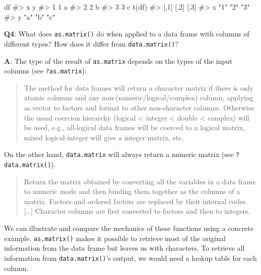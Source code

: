 \documentclass[
]{krantz}
\makeatletter
\newenvironment{Shaded}{\begin{snugshade}}{\end{snugshade}}
\newcommand{\CommentTok}[1]{\textcolor[rgb]{0.56,0.35,0.01}{\textit{#1}}}
\newcommand{\KeywordTok}[1]{\textcolor[rgb]{0.13,0.29,0.53}{\textbf{#1}}}
\newcommand{\NormalTok}[1]{#1}
\newenvironment{kframe}{%
\medskip{}
\setlength{\fboxsep}{.8em}
 \def\at@end@of@kframe{}%
 \ifinner\ifhmode%
  \def\at@end@of@kframe{\end{minipage}}%
  \begin{minipage}{\columnwidth}%
 \fi\fi%
 \def\FrameCommand##1{\hskip\@totalleftmargin \hskip-\fboxsep
 \colorbox{shadecolor}{##1}\hskip-\fboxsep
     \hskip-\linewidth \hskip-\@totalleftmargin \hskip\columnwidth}%
 \MakeFramed {\advance\hsize-\width
   \@totalleftmargin\z@ \linewidth\hsize
   \@setminipage}}%
 {\par\unskip\endMakeFramed%
 \at@end@of@kframe}
\renewenvironment{Shaded}{\begin{kframe}}{\end{kframe}}
\renewcommand{\KeywordTok} [1]{\textcolor[rgb]{0.00,0.44,0.13}{{#1}}}
\renewcommand{\CommentTok} [1]{\textcolor[rgb]{0.38,0.63,0.69}{{#1}}}
\renewcommand{\NormalTok}  [1]{{#1}}
\makeatother
\begin{document}
\begin{Shaded}
\begin{Highlighting}[]
\NormalTok{df}
\CommentTok{#>   x y}
\CommentTok{#> 1 1 a}
\CommentTok{#> 2 2 b}
\CommentTok{#> 3 3 c}
\KeywordTok{t}\NormalTok{(df)}
\CommentTok{#>   [,1] [,2] [,3]}
\CommentTok{#> x "1"  "2"  "3" }
\CommentTok{#> y "a"  "b"  "c"}
\end{Highlighting}
\end{Shaded}

\textbf{{Q4}}: What does \texttt{as.matrix()} do when applied to a data frame with columns of different types? How does it differ from \texttt{data.matrix()}?

\textbf{{A}}: The type of the result of \texttt{as.matrix} depends on the types of the input columns (see \texttt{?as.matrix}):

\begin{quote}
The method for data frames will return a character matrix if there is only atomic columns and any non-(numeric/logical/complex) column, applying as.vector to factors and format to other non-character columns. Otherwise the usual coercion hierarchy (logical \textless{} integer \textless{} double \textless{} complex) will be used, e.g., all-logical data frames will be coerced to a logical matrix, mixed logical-integer will give a integer matrix, etc.
\end{quote}

On the other hand, \texttt{data.matrix} will always return a numeric matrix (see \texttt{?data.matrix()}).

\begin{quote}
Return the matrix obtained by converting all the variables in a data frame to numeric mode and then binding them together as the columns of a matrix. Factors and ordered factors are replaced by their internal codes. {[}\ldots{]} Character columns are first converted to factors and then to integers.
\end{quote}

We can illustrate and compare the mechanics of these functions using a concrete example. \texttt{as.matrix()} makes it possible to retrieve most of the original information from the data frame but leaves us with characters. To retrieve all information from \texttt{data.matrix()}'s output, we would need a lookup table for each column.
\end{document}
